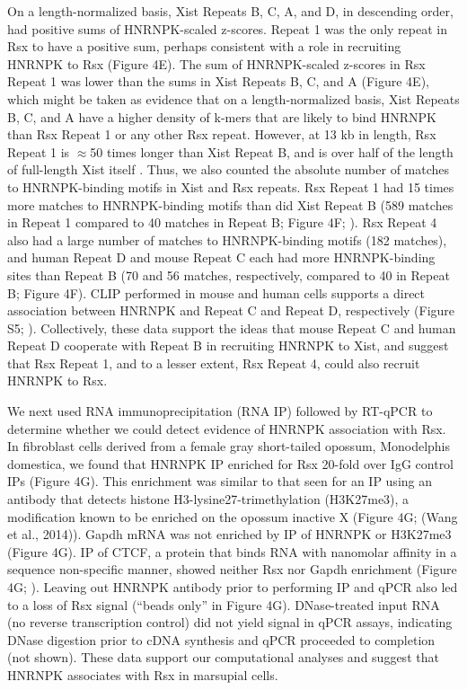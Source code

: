 On a length-normalized basis, Xist Repeats B, C, A, and D, in descending order, had positive sums of HNRNPK-scaled z-scores. Repeat 1 was the only repeat in Rsx to have a positive sum, perhaps consistent with a role in recruiting HNRNPK to Rsx (Figure 4E). The sum of HNRNPK-scaled z-scores in Rsx Repeat 1 was lower than the sums in Xist Repeats B, C, and A (Figure 4E), which might be taken as evidence that on a length-normalized basis, Xist Repeats B, C, and A have a higher density of k-mers that are likely to bind HNRNPK than Rsx Repeat 1 or any other Rsx repeat. However, at 13 kb in length, Rsx Repeat 1 is $\approx$50 times longer than Xist Repeat B, and is over half of the length of full-length Xist itself \cite{Brockdorff10TheNucleus.,Brown10TheNucleus.,Johnson2018AdaptationGenome}. Thus, we also counted the absolute number of matches to HNRNPK-binding motifs in Xist and Rsx repeats. Rsx Repeat 1 had 15 times more matches to HNRNPK-binding motifs than did Xist Repeat B (589 matches in Repeat 1 compared to 40 matches in Repeat B; Figure 4F; \cite{Bailey2009MEMESearching}). Rsx Repeat 4 also had a large number of matches to HNRNPK-binding motifs (182 matches), and human Repeat D and mouse Repeat C each had more HNRNPK-binding sites than Repeat B (70 and 56 matches, respectively, compared to 40 in Repeat B; Figure 4F). CLIP performed in mouse and human cells supports a direct association between HNRNPK and Repeat C and Repeat D, respectively (Figure S5; \cite{Cirillo2016QuantitativeEditor,VanNostrand2016RobusteCLIP}). Collectively, these data support the ideas that mouse Repeat C and human Repeat D cooperate with Repeat B in recruiting HNRNPK to Xist, and suggest that Rsx Repeat 1, and to a lesser extent, Rsx Repeat 4, could also recruit HNRNPK to Rsx. 

We next used RNA immunoprecipitation (RNA IP) followed by RT-qPCR to determine whether we could detect evidence of HNRNPK association with Rsx. In fibroblast cells derived from a female gray short-tailed opossum, Monodelphis domestica, we found that HNRNPK IP enriched for Rsx 20-fold over IgG control IPs (Figure 4G). This enrichment was similar to that seen for an IP using an antibody that detects histone H3-lysine27-trimethylation (H3K27me3), a modification known to be enriched on the opossum inactive X (Figure 4G; (Wang et al., 2014)). Gapdh mRNA was not enriched by IP of HNRNPK or H3K27me3 (Figure 4G). IP of CTCF, a protein that binds RNA with nanomolar affinity in a sequence non-specific manner, showed neither Rsx nor Gapdh enrichment (Figure 4G; \cite{Kung2015Locus-specificCTCF}). Leaving out HNRNPK antibody prior to performing IP and qPCR also led to a loss of Rsx signal (“beads only” in Figure 4G). DNase-treated input RNA (no reverse transcription control) did not yield signal in qPCR assays, indicating DNase digestion prior to cDNA synthesis and qPCR proceeded to completion (not shown). These data support our computational analyses and suggest that HNRNPK associates with Rsx in marsupial cells.

